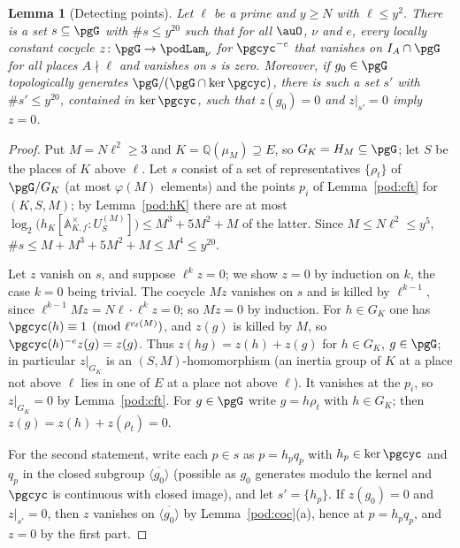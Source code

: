\documentclass[10pt]{amsart}
\newtheorem{lemma}[theorem]{Lemma}
\theoremstyle{definition}
\theoremstyle{remark}
\newcommand{\Q}{\mathbb Q}
\begin{document}
\begin{lemma}[Detecting points]\label{pod:detect}
Let $\ell$ be a prime and $y\ge N$ with $\ell\le y^2$. There is a set $s\subseteq\pgG$ with $\#s\le
y^{20}$ such that for all $\auO$, $\nu$ and $e$, every locally constant cocycle $z\colon\pgG\to
\podLam_\nu$ for $\pgcyc^{-e}$ that vanishes on $I_A\cap\pgG$ for all places $A\nmid\ell$ and
vanishes on $s$ is zero. Moreover, if $g_0\in\pgG$ topologically generates $\pgG/(\pgG\cap\ker
\pgcyc)$, there is such a set $s'$ with $\#s'\le y^{20}$, contained in $\ker\pgcyc$, such that
$z(g_0)=0$ and $z|_{s'}=0$ imply $z=0$.
\end{lemma}
\begin{proof}
Put $M=N\ell^2\ge3$ and $K=\Q(\mu_M)\supseteq E$, so $G_K=H_M\subseteq\pgG$; let $S$ be the places of
$K$ above $\ell$. Let $s$ consist of a set of representatives $\{\rho_t\}$ of $\pgG/G_K$ (at most
$\varphi(M)$ elements) and the points $p_i$ of Lemma~\ref{pod:cft} for $(K,S,M)$; by
Lemma~\ref{pod:hK} there are at most $\log_2\bigl(h_K[\mathbb A^\times_{K,f}:U_S^{(M)}]\bigr)\le
M^3+5M^2+M$ of the latter. Since $M\le N\ell^2\le y^5$, $\#s\le M+M^3+5M^2+M\le M^4\le y^{20}$.

Let $z$ vanish on $s$, and suppose $\ell^kz=0$; we show $z=0$ by induction on $k$, the case $k=0$
being trivial. The cocycle $Mz$ vanishes on $s$ and is killed by $\ell^{k-1}$, since
$\ell^{k-1}Mz=N\ell\cdot\ell^kz=0$; so $Mz=0$ by induction. For $h\in G_K$ one has
$\pgcyc(h)\equiv1\pmod{\ell^{v_\ell(M)}}$, and $z(g)$ is killed by $M$, so $\pgcyc(h)^{-e}z(g)=z(g)$. Thus $z(hg)=z(h)+z(g)$ for $h\in G_K$, $g\in
\pgG$; in particular $z|_{G_K}$ is an $(S,M)$-homomorphism (an inertia group of $K$ at a place not
above $\ell$ lies in one of $E$ at a place not above $\ell$). It vanishes at the $p_i$, so
$z|_{G_K}=0$ by Lemma~\ref{pod:cft}. For $g\in\pgG$ write $g=h\rho_t$ with $h\in G_K$; then
$z(g)=z(h)+z(\rho_t)=0$.

For the second statement, write each $p\in s$ as $p=h_pq_p$ with $h_p\in\ker\pgcyc$ and $q_p$ in the
closed subgroup $\overline{\langle g_0\rangle}$ (possible as $g_0$ generates modulo the kernel and
$\pgcyc$ is continuous with closed image), and let $s'=\{h_p\}$. If $z(g_0)=0$ and $z|_{s'}=0$, then
$z$ vanishes on $\overline{\langle g_0\rangle}$ by Lemma~\ref{pod:coc}(a), hence at $p=h_pq_p$, and
$z=0$ by the first part.
\end{proof}
\end{document}
